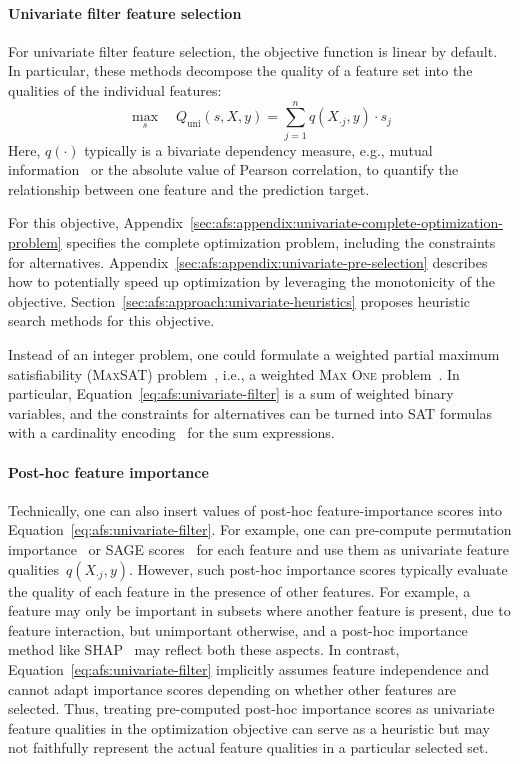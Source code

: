\documentclass{article}
\theoremstyle{definition}
\begin{document}
\paragraph{Univariate filter feature selection}

For univariate filter feature selection, the objective function is linear by default.
In particular, these methods decompose the quality of a feature set into the qualities of the individual features:
%
\begin{equation}
	\max_s \quad Q_{\text{uni}}(s,X,y) = \sum_{j=1}^{n} q(X_{\cdot{}j},y) \cdot s_j
	\label{eq:afs:univariate-filter}
\end{equation}
%
Here, $q(\cdot)$ typically is a bivariate dependency measure, e.g., mutual information~\cite{kraskov2004estimating} or the absolute value of Pearson correlation, to quantify the relationship between one feature and the prediction target.

For this objective, Appendix~\ref{sec:afs:appendix:univariate-complete-optimization-problem} specifies the complete optimization problem, including the constraints for alternatives.
Appendix~\ref{sec:afs:appendix:univariate-pre-selection} describes how to potentially speed up optimization by leveraging the monotonicity of the objective.
Section~\ref{sec:afs:approach:univariate-heuristics} proposes heuristic search methods for this objective.

Instead of an integer problem, one could formulate a weighted partial maximum satisfiability (\textsc{MaxSAT}) problem~\cite{bacchus2021maximum, li2021maxsat}, i.e., a weighted \textsc{Max One} problem~\cite{khanna1997complete}.
In particular, Equation~\ref{eq:afs:univariate-filter} is a sum of weighted binary variables, and the constraints for alternatives can be turned into SAT formulas with a cardinality encoding~\cite{sinz2005towards} for the sum expressions.

\paragraph{Post-hoc feature importance}

Technically, one can also insert values of post-hoc feature-importance scores into Equation~\ref{eq:afs:univariate-filter}.
For example, one can pre-compute permutation importance~\cite{breiman2001random} or SAGE scores~\cite{covert2020understanding} for each feature and use them as univariate feature qualities~$q(X_{\cdot{}j},y)$.
However, such post-hoc importance scores typically evaluate the quality of each feature in the presence of other features. 
For example, a feature may only be important in subsets where another feature is present, due to feature interaction, but unimportant otherwise, and a post-hoc importance method like SHAP~\cite{lundberg2017unified} may reflect both these aspects.
In contrast, Equation~\ref{eq:afs:univariate-filter} implicitly assumes feature independence and cannot adapt importance scores depending on whether other features are selected.
Thus, treating pre-computed post-hoc importance scores as univariate feature qualities in the optimization objective can serve as a heuristic but may not faithfully represent the actual feature qualities in a particular selected set.
\end{document}
